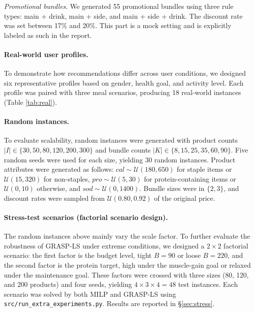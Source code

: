 \documentclass[a4paper]{article}
\begin{document}
\textit{Promotional bundles.} We generated 55 promotional bundles using three rule types: main + drink, main + side, and main + side + drink. The discount rate was set between 17\% and 20\%. This part is a mock setting and is explicitly labeled as such in the report.

\paragraph{Real-world user profiles.}To demonstrate how recommendations differ across user conditions, we designed six representative profiles based on gender, health goal, and activity level. Each profile was paired with three meal scenarios, producing 18 real-world instances (Table \ref{tab:real}).

\paragraph{Random instances.}To evaluate scalability, random instances were generated with product counts $|I|\in\{30,50,80,120,200,300\}$ and bundle counts $|K|\in\{8,15,25,35,60,90\}$. Five random seeds were used for each size, yielding 30 random instances. Product attributes were generated as follows: $cal\sim \mathcal{U}(180,650)$ for staple items or $\mathcal{U}(15,320)$ for non-staples, $pro\sim \mathcal{U}(5,30)$ for protein-containing items or $\mathcal{U}(0,10)$ otherwise, and $sod\sim \mathcal{U}(0,1400)$. Bundle sizes were in $\{2,3\}$, and discount rates were sampled from $\mathcal{U}(0.80,0.92)$ of the original price.

\paragraph{Stress-test scenarios (factorial scenario design).}The random instances above mainly vary the scale factor. To further evaluate the robustness of GRASP-LS under extreme conditions, we designed a $2\times2$ factorial scenario: the first factor is the budget level, tight $B=90$ or loose $B=220$, and the second factor is the protein target, high under the muscle-gain goal or relaxed under the maintenance goal. These factors were crossed with three sizes (80, 120, and 200 products) and four seeds, yielding $4\times3\times4=48$ test instances. Each scenario was solved by both MILP and GRASP-LS using \texttt{src/run\_extra\_experiments.py}. Results are reported in \S\ref{sec:stress}.
\end{document}
